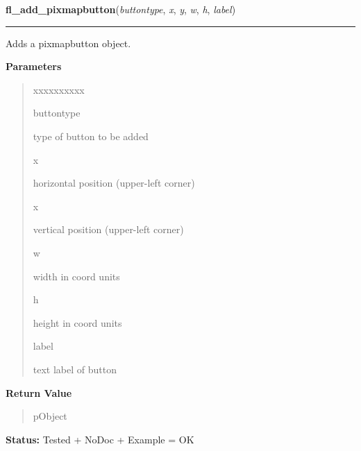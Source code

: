 \hspace{.8\funcindent}\begin{boxedminipage}{\funcwidth}

    \raggedright \textbf{fl\_add\_pixmapbutton}(\textit{buttontype}, \textit{x}, \textit{y}, \textit{w}, \textit{h}, \textit{label})

    \vspace{-1.5ex}

    \rule{\textwidth}{0.5\fboxrule}
\setlength{\parskip}{2ex}
    Adds a pixmapbutton object.

\setlength{\parskip}{1ex}
      \textbf{Parameters}
      \vspace{-1ex}

      \begin{quote}
        \begin{Ventry}{xxxxxxxxxx}

          \item[buttontype]

          type of button to be added

          \item[x]

          horizontal position (upper-left corner)

          \item[x]

          vertical position (upper-left corner)

          \item[w]

          width in coord units

          \item[h]

          height in coord units

          \item[label]

          text label of button

        \end{Ventry}

      \end{quote}

      \textbf{Return Value}
    \vspace{-1ex}

      \begin{quote}
      pObject

      \end{quote}

\textbf{Status:} Tested + NoDoc + Example = OK



    \end{boxedminipage}

